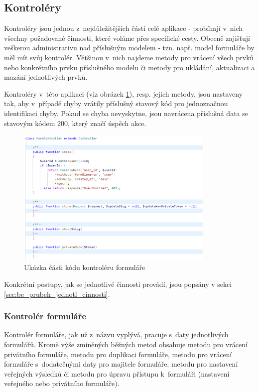 	\subsection{Kontroléry}
    Kontroléry jsou jednou z~nejdůležitějších částí celé aplikace - probíhají v~nich všechny požadované činnosti, které voláme přes specifické cesty. Obecně zajišťují veškerou administrativu nad příslušným modelem - tzn. např. model formuláře by měl mít svůj kontrolér. Většinou v~nich najdeme metody pro vrácení všech prvků nebo konkrétního prvku příslušného modelu či metody pro ukládání, aktualizaci a mazání jednotlivých prvků.
    
    Kontroléry v~této aplikaci (viz obrázek \ref{fig:kontroler}), resp. jejich metody, jsou nastaveny tak, aby v~případě chyby vrátily příslušný stavový kód pro jednoznačnou identifikaci chyby. Pokud se chyba nevyskytne, jsou navrácena příslušná data se stavovým kódem 200, který značí úspěch akce. 
    
    \begin{figure}[H]
    	\centering
    	\includegraphics[width=0.85\textwidth]{img/kontroler.png}
    	\caption{Ukázka části kódu kontroléru formuláře}
    	\label{fig:kontroler}
    \end{figure}
    
    Konkrétní postupy, jak se jednotlivé činnosti provádí, jsou popsány v sekci \ref{sec:be_prubeh_jednotl_cinnosti}.
    
		\subsubsection{Kontrolér formuláře}
		Kontrolér formuláře, jak už z~názvu vyplývá, pracuje s~daty jednotlivých formulářů. Kromě výše zmíněných běžných metod obsahuje metodu pro vrácení privátního formuláře, metodu pro duplikaci formuláře, metodu pro vrácení formuláře s~dodatečnými daty pro majitele formuláře, metodu pro nastavení veřejných výsledků či metodu pro úpravu přístupu k~formuláři (nastavení veřejného nebo privátního formuláře).
		
